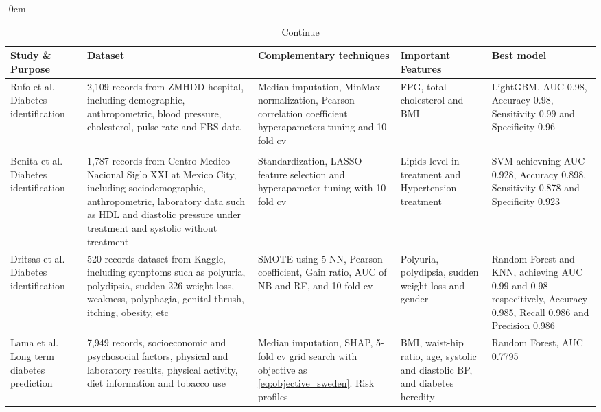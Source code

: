 \documentclass[journal,article,submit,pdftex,moreauthors]{Definitions/mdpi}
\begin{document}
	\begin{table}[H]
		\caption{Continue\label{tab2}}
			\begin{adjustwidth}{-\extralength}{0cm}
				\begin{tabularx}{\fulllength}{CCCCC}
					\toprule
					\textbf{Study \& Purpose}	& \textbf{Dataset}	& \textbf{Complementary techniques}     & \textbf{Important Features}	& \textbf{Best model}\\
					\midrule
				
				\footnotesize{\cite{Rufo} Rufo et al. Diabetes identification}&\footnotesize{2,109 records from ZMHDD hospital, including
				demographic, anthropometric, blood pressure, cholesterol, pulse rate and FBS data}
				&\footnotesize{Median imputation, MinMax normalization, Pearson correlation coefficient hyperapameters tuning and 10-fold cv}&
				\footnotesize{FPG, total cholesterol and BMI }& \footnotesize{LightGBM. AUC 0.98, Accuracy 0.98, Sensitivity 0.99 and Specificity
				0.96 }\\
				\\
				\footnotesize{\cite{Benita} Benita et al. Diabetes identification}&\footnotesize{1,787 records from  Centro
				Medico Nacional Siglo XXI at Mexico City, including  sociodemographic, anthropometric, laboratory data 
				such as HDL and diastolic pressure under treatment and systolic without treatment}&
				\footnotesize{Standardization, LASSO feature selection and hyperapameter tuning with 10-fold cv}&
				\footnotesize{Lipids level in treatment and Hypertension treatment}&\footnotesize{SVM achievning AUC 0.928,
				Accuracy 0.898, Sensitivity 0.878 and Specificity 0.923}\\

				\footnotesize{\cite{Dritsas} Dritsas et al. Diabetes identification}&\footnotesize{ 520 records dataset from Kaggle, including
				symptoms such as   polyuria, polydipsia, sudden 226
				weight loss, weakness, polyphagia, genital thrush, itching, obesity, etc}&
				\footnotesize{SMOTE using 5-NN, Pearson coefficient, Gain ratio, AUC of NB and RF, and 10-fold cv}
				&\footnotesize{ Polyuria, polydipsia, sudden weight loss and gender}&\footnotesize{Random Forest
				and KNN, achieving  AUC 0.99 and 0.98 respecitively, Accuracy 0.985, Recall 0.986 and Precision 0.986}\\
				
				\footnotesize{\cite{LAMA2021e07419}	Lama et al.}\footnotesize{ Long term diabetes prediction}	&\footnotesize{7,949 records, socioeconomic and psychosocial factors, physical and laboratory results,
				physical activity, diet information and tobacco use}&\footnotesize{ Median imputation, SHAP, 5-fold cv grid search with objective as \ref{eq:objective_sweden}. Risk profiles}
					& \footnotesize{BMI, waist-hip ratio, age,
					systolic and diastolic BP, and diabetes heredity}&\footnotesize{Random Forest,\hspace{25pt} AUC 0.7795}\\
				

\end{tabularx}
\end{adjustwidth}
\end{table}
\end{document}
